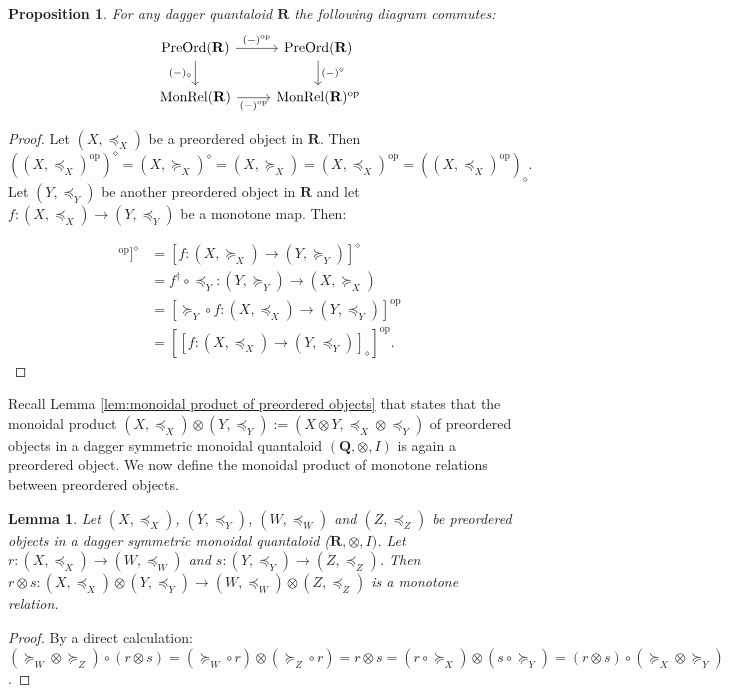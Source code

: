 \documentclass[12pt]{tac}
\newtheorem{lemma}[theorem]{Lemma}
\newtheorem{proposition}[theorem]{Proposition}
\theoremstyle{definition}
\theoremstyle{remark}
\newcommand{\qo}{{\boldsymbol{\preccurlyeq}}}
\newcommand{\qop}{{\boldsymbol{\succcurlyeq}}}
\newcommand{\qedhere}{}
\newcommand{\<}{\langle}
\renewcommand{\>}{\rangle}
\renewcommand{\:}{\colon}
\newcommand{\op}{\mathrm{op}}
\begin{document}
\begin{proposition} For any dagger quantaloid $\mathbf R$ the following diagram commutes:
\[\begin{tikzcd}
\mathrm{PreOrd}(\mathbf R)\ar{r}{(-)^\op}\ar{d}[swap]{(-)_\diamond} & \mathrm{PreOrd}(\mathbf R)\ar{d}{(-)^\diamond}\\
\mathrm{MonRel}(\mathbf R)\ar{r}[swap]{(-)^\op} & \mathrm{MonRel}(\mathbf R)^\op
\end{tikzcd}\]
\end{proposition}
\begin{proof}
    Let $(X,\qo_X)$ be a preordered object in $\mathbf R$. Then
    \[ ((X,\qo_X)^\op)^\diamond=(X,\qop_X)^\diamond=(X,\qop_X)=(X,\qo_X)^\op=((X,\qo_X)^\op)_\diamond. \]
    Let $(Y,\qo_Y)$ be another preordered object in $\mathbf R$ and let $f:(X,\qo_X)\to(Y,\qo_Y)$ be a monotone map. Then:

\begin{align*}
    [[f:(X,\qo_X)\to(Y,\qo_Y)]^\op]^\diamond & = [f:(X,\qop_X)\to(Y,\qop_Y)]^\diamond \\ 
    &  = f^\dag\circ \qo_Y:(Y,\qop_Y)\to (X,\qop_X)\\
    & = [ \qop_Y\circ f:(X,\qo_X)\to(Y,\qo_Y)]^\op\\
    & = [[f:(X,\qo_X)\to(Y,\qo_Y)]_\diamond]^\op. \qedhere
\end{align*}
\end{proof}

Recall Lemma \ref{lem:monoidal product of preordered objects} that states that the monoidal product $(X,\qo_X)\otimes(Y,\qo_Y):=(X\otimes Y,\qo_X\otimes\qo_Y)$ of preordered objects in a dagger symmetric monoidal quantaloid $(\mathbf Q,\otimes,I)$ is again a preordered object. We now define the monoidal product of monotone relations between preordered objects.

\begin{lemma}\label{lem:monoidal product of monotone relations}
    Let $(X,\qo_X)$, $(Y,\qo_Y)$, $(W,\qo_W)$ and $(Z,\qo_Z)$ be preordered objects in a dagger symmetric monoidal quantaloid ($\mathbf R,\otimes,I)$. Let $r:(X,\qo_X)\to (W,\qo_W)$ and $s:(Y,\qo_Y)\to (Z,\qo_Z)$. Then $r\otimes s:(X,\qo_X)\otimes(Y,\qo_Y)\to (W,\qo_W)\otimes (Z,\qo_Z)$ is a monotone relation.
\end{lemma}
\begin{proof}
By a direct calculation: $(\qop_W\otimes\qop_Z)\circ (r\otimes s)=(\qop_W\circ r)\otimes(\qop_Z\circ r)=r\otimes s=(r\circ\qop_X)\otimes(s\circ\qop_Y)=(r\otimes s)\circ(\qop_X\otimes \qop_Y)$.
\end{proof}
\end{document}
